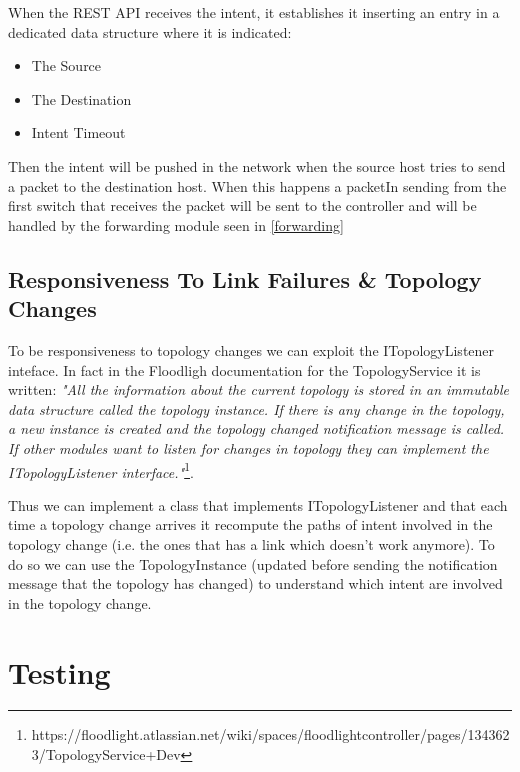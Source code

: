 \documentclass[a4paper]{report}
\begin{document}
	\noindent When the REST API receives the intent, it establishes it inserting an entry in a dedicated data structure where it is indicated:
	\begin{itemize}
	\item The Source
	\item The Destination
	\item Intent Timeout
	\end{itemize}
	
	\noindent Then the intent will be pushed in the network when the source host tries to send a packet to the destination host. When this happens a packetIn sending from the first switch that receives the packet will be sent to the controller and will be handled by the forwarding module seen in \ref{forwarding}
	
	\section{Responsiveness To Link Failures \& Topology Changes}
	To be responsiveness to topology changes we can exploit the ITopologyListener inteface. In fact in the Floodligh documentation for the TopologyService it is written: \textit{"All the information about the current topology is stored in an immutable data structure called the topology instance. If there is any change in the topology, a new instance is created and the topology changed notification message is called. If other modules want to listen for changes in topology they can implement the ITopologyListener interface."}\footnote{https://floodlight.atlassian.net/wiki/spaces/floodlightcontroller/pages/1343623/TopologyService+Dev}.
	
	\noindent Thus we can implement a class that implements ITopologyListener and that each time a topology change arrives it recompute the paths of intent involved in the topology change (i.e. the ones that has a link which doesn't work anymore). To do so we can use the TopologyInstance (updated before sending the notification message that the topology has changed) to understand which intent are involved in the topology change.
	
	\chapter{Testing}
	
\end{document}
